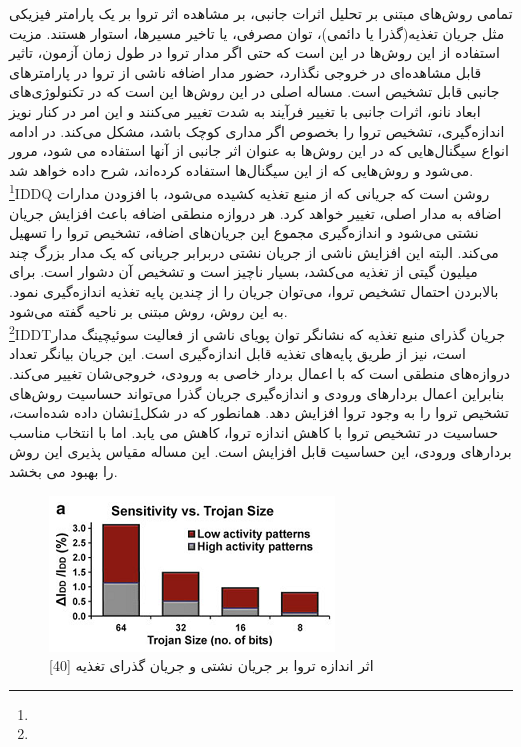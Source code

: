 تمامی روش‌های مبتنی بر تحلیل اثرات جانبی، بر مشاهده اثر تروا بر یک پارامتر فیزیکی مثل جریان تغذیه(گذرا یا دائمی)، توان مصرفی، یا تاخیر مسیرها، استوار هستند. مزیت استفاده از این روش‌ها در این است که حتی اگر مدار تروا در طول زمان آزمون، تاثیر قابل مشاهده‌ای در خروجی نگذارد، حضور مدار اضافه ناشی از تروا در پارامترهای جانبی قابل تشخیص است. مساله اصلی در این روش‌ها این است که در تکنولوژی‌های ابعاد نانو، اثرات جانبی با تغییر فرآیند به شدت تغییر می‌کنند و این امر در کنار نویز اندازه‌گیری، تشخیص تروا را بخصوص اگر مداری کوچک باشد، مشکل می‌کند. در ادامه انواع سیگنال‌هایی که در این روش‌ها به عنوان اثر جانبی از آنها استفاده می شود، مرور می‌شود و روش‌هایی که از این سیگنال‌ها استفاده کرده‌اند، شرح داده خواهد شد.
\\
\footnote{}IDDQ روشن است که جریانی که از منبع تغذیه کشیده می‌شود، با افزودن مدارات اضافه به مدار اصلی، تغییر خواهد کرد. هر دروازه منطقی اضافه باعث افزایش جریان نشتی  می‌شود و اندازه‌گیری مجموع این جریان‌های اضافه، تشخیص تروا را تسهیل می‌کند. البته این افزایش ناشی از جریان نشتی دربرابر جریانی که یک مدار بزرگ چند میلیون گیتی از تغذیه می‌کشد، بسیار ناچیز است و تشخیص آن دشوار است. برای بالابردن احتمال تشخیص تروا، می‌توان جریان را از چندین پایه تغذیه اندازه‌گیری نمود. به این روش، روش مبتنی بر ناحیه گفته می‌شود.
\\
\footnote{}IDDTجریان گذرای منبع تغذیه که نشانگر توان پویای ناشی از فعالیت سوئیچینگ مدار است، نیز از طریق پایه‌های تغذیه قابل اندازه‌گیری است. این جریان بیانگر تعداد دروازه‌های منطقی است که با اعمال بردار خاصی به ورودی، خروجی‌شان تغییر می‌کند. بنابراین اعمال بردارهای ورودی و اندازه‌گیری جریان گذرا می‌تواند حساسیت روش‌های تشخیص تروا  را به وجود تروا افزایش دهد. همانطور که در شکل\ref{fig4-4}نشان داده شده‌است، حساسیت در تشخیص تروا با کاهش اندازه تروا، کاهش می یابد. اما با انتخاب مناسب بردارهای ورودی، این حساسیت قابل افزایش است. این مساله مقیاس پذیری این روش را بهبود می بخشد.
 \begin{figure}
\begin{center}
\includegraphics[scale=1]{figs/fig4-4.png}
\caption{اثر اندازه تروا بر جریان نشتی و جریان گذرای تغذیه [40]}
\label{fig4-4}
\end{center}
\end{figure} 

